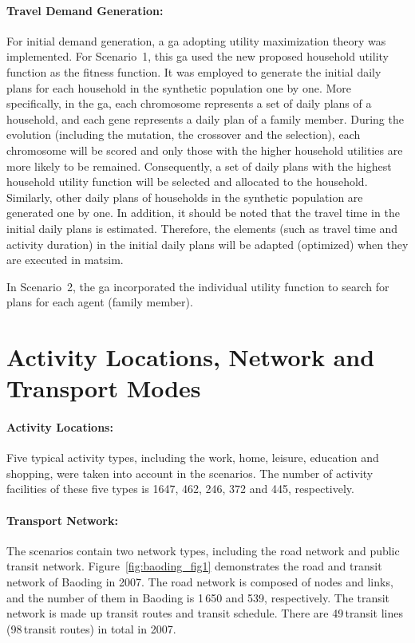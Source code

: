 \paragraph{Travel Demand Generation:}
For initial demand generation, a \gls{ga} adopting utility maximization theory was implemented. 
For Scenario~1, this \gls{ga} used the new proposed household utility function as the fitness function. 
It was employed to generate the initial daily plans for each household in the synthetic population one by one. 
More specifically, in the \gls{ga}, each chromosome represents a set of daily plans of a household, and each gene represents a daily plan of a family member. 
During the evolution (including the mutation, the crossover and the selection), each chromosome will be scored and only those with the higher household utilities are more likely to be remained. Consequently, a set of daily plans with the highest household utility function will be selected and allocated to the household. 
Similarly, other daily plans of households in the synthetic population are generated one by one. 
In addition, it should be noted that the travel time in the initial daily plans is estimated. 
Therefore, the elements (such as travel time and activity duration) in the initial daily plans will be adapted (optimized) when they are executed in \gls{matsim}.

In Scenario~2, the \gls{ga} incorporated the individual utility function to search for plans for each agent (family member).

\section{Activity Locations, Network and Transport Modes}
\paragraph{Activity Locations:} Five typical activity types, including the work, home, leisure, education and shopping, were taken into account in the scenarios. 
The number of activity facilities of these five types is 1647, 462, 246, 372 and 445, respectively. 

\paragraph{Transport Network:} The scenarios contain two network types, including the road network and public transit network. 
Figure~\ref{fig:baoding_fig1} demonstrates the road and transit network of Baoding in 2007. The road network is composed of nodes and links, and the number of them in Baoding is 1\,650 and 539, respectively. 
The transit network is made up transit routes and transit schedule. There are 49\,transit lines (98\,transit routes) in total in 2007. 

